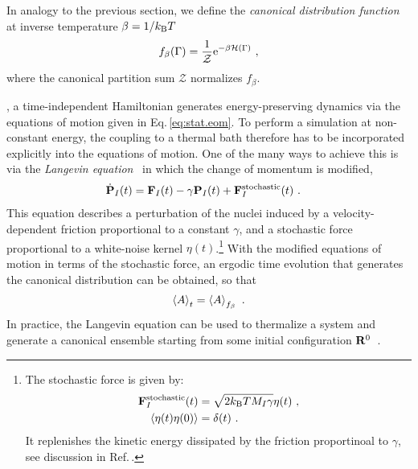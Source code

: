 In analogy to the previous section, we define the \emph{canonical distribution function} at inverse temperature $\beta = 1 / k_{\rm B} T$
\begin{align}
	f_\beta (\Gamma) 
		= \frac{1}{\mathcal{Z}} {\rm e}^{- \beta \mathcal H (\Gamma)}~,
	\label{eq:f.canonical}
\end{align}
where the  canonical partition sum $\mathcal{Z}$ normalizes $f_\beta$. 

, a time-independent Hamiltonian generates energy-preserving dynamics via the equations of motion given in Eq.\,\eqref{eq:stat.eom}. To perform a simulation at non-constant energy, the coupling to a thermal bath therefore has to be incorporated explicitly into the equations of motion. One of the many ways to achieve this is via the \emph{Langevin equation}~\cite{Vanden2006} in which the change of momentum is modified,
\begin{align}
	\dot{\b P}_I (t) 
		&= \b F_I (t) - \gamma \b P_I (t) + \b F^{\rm stochastic}_I (t)~.
	\label{eq:stat.Langevin}
\end{align}
This equation describes a perturbation of the nuclei induced by a velocity-dependent friction proportional to a constant $\gamma$,%
and a stochastic force proportional to a white-noise kernel $\eta (t)$.\footnote{
	The stochastic force is given by:
	\begin{align*}
	{\bf F}^{\rm stochastic}_I (t) 
	&= \sqrt{2 k_{\rm B} T M_I \gamma} \eta (t)~, \\
	\braket{\eta (t) \eta (0)}
	& = \delta (t)~.
	\end{align*}
	It replenishes the kinetic energy dissipated by the friction proportinoal to $\gamma$, see discussion in Ref.\,\cite[p.\,328]{Phillies2012}.
}
With the modified equations of motion in terms of the stochastic force, an ergodic time evolution that generates the canonical distribution can be obtained, so that
\begin{align}
  \braket{A}_t = \braket{A}_{f_\beta}~.
\end{align}
In practice, the Langevin equation can be used to thermalize a system and generate a canonical ensemble starting from some initial configuration ${\bf R}^0$~\cite[p.\,590]{Tuckerman}.

